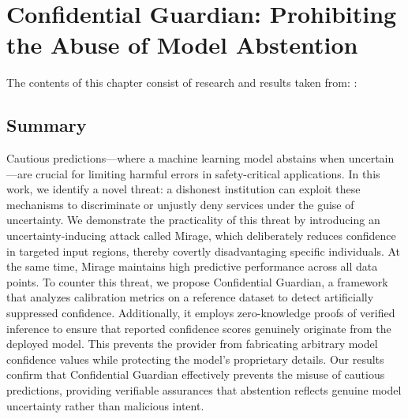 \newcommand{\myparagraph}[1]{\vspace{1ex}\noindent{\bf #1}}
\def\name{\textit{Confidential Guardian}\xspace}
\def\attack{\textit{Mirage}\xspace}
\def\uncertreg{$\mathcal{X}_\text{unc}$\xspace}
\def\missingnumber{\textcolor{red}{\textbf{XXX}}\xspace}

\newcommand{\prover}{\ensuremath{\mathcal{P}}\xspace}
\newcommand{\verifier}{\ensuremath{\mathcal{V}}\xspace}
\newcommand{\comm}[1]{\ensuremath{\llbracket #1 \rrbracket}}
\newcommand{\relu}{\ensuremath{\texttt{ReLU}}\xspace}


\chapter{Confidential Guardian: Prohibiting the Abuse of Model Abstention}
\label{ch:conf_guard}

\begin{paperref}
\normalfont
The contents of this chapter consist of research and results taken from: \citet{rabanser2025confidential}: \emph{}
\end{paperref}

\section*{Summary}

Cautious predictions---where a machine learning model abstains when uncertain---are crucial for limiting harmful errors in safety-critical applications. In this work, we identify a novel threat: a dishonest institution can exploit these mechanisms to discriminate or unjustly deny services under the guise of uncertainty. We demonstrate the practicality of this threat by introducing an uncertainty-inducing attack called Mirage, which deliberately reduces confidence in targeted input regions, thereby covertly disadvantaging specific individuals. At the same time, Mirage maintains high predictive performance across all data points. To counter this threat, we propose Confidential Guardian, a framework that analyzes calibration metrics on a reference dataset to detect artificially suppressed confidence. Additionally, it employs zero-knowledge proofs of verified inference to ensure that reported confidence scores genuinely originate from the deployed model. This prevents the provider from fabricating arbitrary model confidence values while protecting the model’s proprietary details. Our results confirm that Confidential Guardian effectively prevents the misuse of cautious predictions, providing verifiable assurances that abstention reflects genuine model uncertainty rather than malicious intent.

